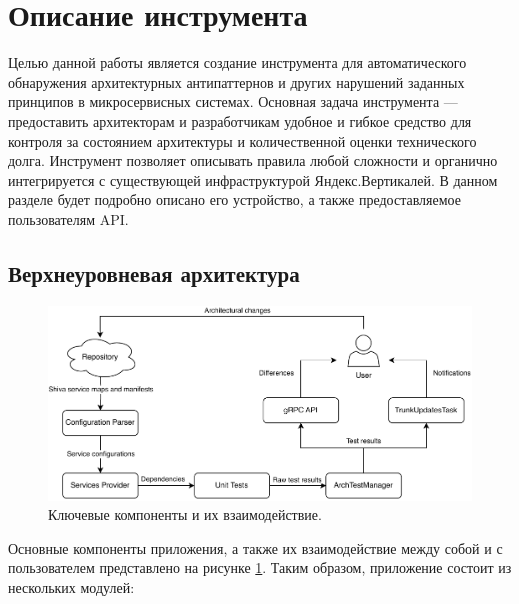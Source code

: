 \section{Описание инструмента}

Целью данной работы является создание инструмента для автоматического обнаружения архитектурных антипаттернов и других нарушений заданных принципов в микросервисных системах. Основная задача инструмента — предоставить архитекторам и разработчикам удобное и гибкое средство для контроля за состоянием архитектуры и количественной оценки технического долга. Инструмент позволяет описывать правила любой сложности и органично интегрируется с существующей инфраструктурой Яндекс.Вертикалей. В данном разделе будет подробно описано его устройство, а также предоставляемое пользователям API.

\subsection{Верхнеуровневая архитектура}

\begin{figure}[ht]
    \centering
    \includegraphics[scale=0.9]{images/archtest-components.drawio.pdf}
    \caption{\label{archtest-components} Ключевые компоненты и их взаимодействие.}
\end{figure}

Основные компоненты приложения, а также их взаимодействие между собой и с пользователем представлено на рисунке \ref{archtest-components}. Таким образом, приложение состоит из нескольких модулей:

